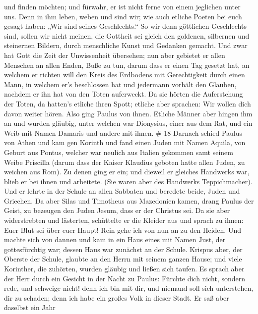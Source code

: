 und finden möchten; und fürwahr, er ist nicht ferne von einem jeglichen
unter uns.  Denn in ihm leben, weben und sind wir; wie auch
etliche Poeten bei euch gesagt haben: „Wir sind seines Geschlechts.``
 So wir denn göttlichen Geschlechts sind, sollen wir nicht
meinen, die Gottheit sei gleich den goldenen, silbernen und steinernen
Bildern, durch menschliche Kunst und Gedanken gemacht.  Und
zwar hat Gott die Zeit der Unwissenheit übersehen; nun aber gebietet er
allen Menschen an allen Enden, Buße zu tun,  darum dass er
einen Tag gesetzt hat, an welchem er richten will den Kreis des
Erdbodens mit Gerechtigkeit durch einen Mann, in welchem er's
beschlossen hat und jedermann vorhält den Glauben, nachdem er ihn hat
von den Toten auferweckt.  Da sie hörten die Auferstehung
der Toten, da hatten's etliche ihren Spott; etliche aber sprachen: Wir
wollen dich davon weiter hören.  Also ging Paulus von
ihnen.  Etliche Männer aber hingen ihm an und wurden
gläubig, unter welchen war Dionysius, einer aus dem Rat, und ein Weib
mit Namen Damaris und andere mit ihnen. \# 18  Darnach
schied Paulus von Athen und kam gen Korinth  und fand einen
Juden mit Namen Aquila, von Geburt aus Pontus, welcher war neulich aus
Italien gekommen samt seinem Weibe Priscilla (darum dass der Kaiser
Klaudius geboten hatte allen Juden, zu weichen aus Rom).  Zu
denen ging er ein; und dieweil er gleiches Handwerks war, blieb er bei
ihnen und arbeitete. (Sie waren aber des Handwerks Teppichmacher).
 Und er lehrte in der Schule an allen Sabbaten und beredete
beide, Juden und Griechen.  Da aber Silas und Timotheus aus
Mazedonien kamen, drang Paulus der Geist, zu bezeugen den Juden Jesum,
dass er der Christus sei.  Da sie aber widerstrebten und
lästerten, schüttelte er die Kleider aus und sprach zu ihnen: Euer Blut
sei über euer Haupt! Rein gehe ich von nun an zu den Heiden.
 Und machte sich von dannen und kam in ein Haus eines mit
Namen Just, der gottesfürchtig war; dessen Haus war zunächst an der
Schule.  Krispus aber, der Oberste der Schule, glaubte an
den Herrn mit seinem ganzen Hause; und viele Korinther, die zuhörten,
wurden gläubig und ließen sich taufen.  Es sprach aber der
Herr durch ein Gesicht in der Nacht zu Paulus: Fürchte dich nicht,
sondern rede, und schweige nicht!  denn ich bin mit dir,
und niemand soll sich unterstehen, dir zu schaden; denn ich habe ein
großes Volk in dieser Stadt.  Er saß aber daselbst ein Jahr
